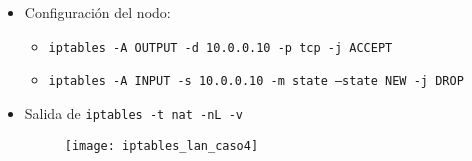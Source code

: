 \begin{itemize}
    \item Configuración del nodo:
    \begin{itemize}
        \item \texttt{iptables -A OUTPUT -d 10.0.0.10 -p tcp -j ACCEPT} 
        \item \texttt{iptables -A INPUT -s 10.0.0.10 -m state --state NEW -j DROP} 
    \end{itemize}
    \item Salida de \texttt{iptables -t nat -nL -v} 
    \begin{figure}[H]
        \centering
        \texttt{[image: iptables\_lan\_caso4]}
    \end{figure}
\end{itemize}



\clearpage
\printbibliography

